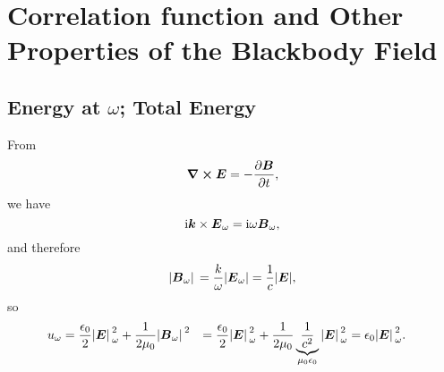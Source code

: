 \documentclass[hyperref, a4paper]{article}
\newcommand*{\ii}{\mathrm{i}}
\def\\{}%
\begin{document}
\section{Correlation function and Other Properties of the Blackbody Field}

\subsection{Energy at $\omega$; Total Energy}

From 
\[
    \curl{\vb*{E}} = - \pdv{\vb*{B}}{t},
\]
we have 
\[
    \ii \vb*{k} \times \vb*{E}_\omega = \ii \omega \vb*{B}_\omega,
\]
and therefore 
\[
    \abs*{\vb*{B}_\omega} = \frac{k}{\omega} \abs{\vb*{E}_\omega} = \frac{1}{c} \abs{\vb*{E}},
\]
so 
\begin{equation}
    \begin{aligned}
        u_\omega &= \frac{\epsilon_0}{2} \abs*{\vb*{E}}_\omega^2 
        + \frac{1}{2 \mu_0} \abs*{\vb*{B}_\omega}^2 \\
        &= \frac{\epsilon_0}{2} \abs*{\vb*{E}}_\omega^2 
        + \frac{1}{2 \mu_0} \underbrace{\frac{1}{c^2}}_{\mu_0 \epsilon_0} \abs*{\vb*{E}}_\omega^2  \\
        &= \epsilon_0 \abs*{\vb*{E}}_\omega^2.
    \end{aligned}
\end{equation}
\end{document}

